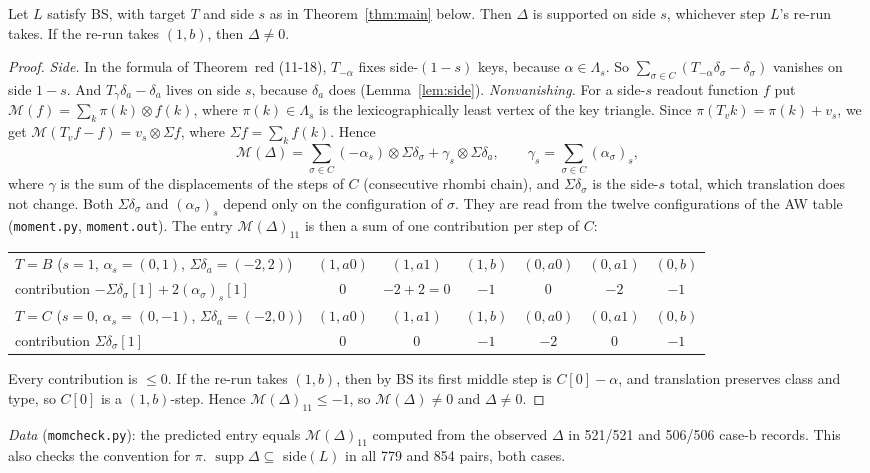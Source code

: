 \documentclass[11pt]{article}
\theoremstyle{definition}\newtheorem{definition}[theorem]{Definition}\newtheorem{remark}[theorem]{Remark}
\begin{document}
\begin{lemma}\label{lem:N}
Let $L$ satisfy BS, with target $T$ and side $s$ as in Theorem~\ref{thm:main} below. Then $\Delta$ is supported on side $s$, whichever step $L$'s re-run takes. If the re-run takes $(1,b)$, then $\Delta\ne0$.
\end{lemma}
\begin{proof}
\emph{Side.} In the formula of Theorem~red (11-18), $T_{-\alpha}$ fixes side-$(1-s)$ keys, because $\alpha\in\Lambda_s$. So $\sum_{\sigma\in C}(T_{-\alpha}\delta_\sigma-\delta_\sigma)$ vanishes on side $1-s$. And $T_\gamma\delta_a-\delta_a$ lives on side $s$, because $\delta_a$ does (Lemma~\ref{lem:side}).
\emph{Nonvanishing.} For a side-$s$ readout function $f$ put $\mathcal M(f)=\sum_k\pi(k)\otimes f(k)$, where $\pi(k)\in\Lambda_s$ is the lexicographically least vertex of the key triangle. Since $\pi(T_vk)=\pi(k)+v_s$, we get $\mathcal M(T_vf-f)=v_s\otimes\Sigma f$, where $\Sigma f=\sum_kf(k)$. Hence
\[\mathcal M(\Delta)=\sum_{\sigma\in C}(-\alpha_s)\otimes\Sigma\delta_\sigma+\gamma_s\otimes\Sigma\delta_a,\qquad\gamma_s=\sum_{\sigma\in C}(\alpha_\sigma)_s,\]
where $\gamma$ is the sum of the displacements of the steps of $C$ (consecutive rhombi chain), and $\Sigma\delta_\sigma$ is the side-$s$ total, which translation does not change. Both $\Sigma\delta_\sigma$ and $(\alpha_\sigma)_s$ depend only on the configuration of $\sigma$. They are read from the twelve configurations of the AW table (\texttt{moment.py}, \texttt{moment.out}). The entry $\mathcal M(\Delta)_{11}$ is then a sum of one contribution per step of $C$:
\begin{center}\small\begin{tabular}{lcccccc}\toprule
$T=B$ ($s=1$, $\alpha_s=(0,1)$, $\Sigma\delta_a=(-2,2)$) & $(1,a0)$ & $(1,a1)$ & $(1,b)$ & $(0,a0)$ & $(0,a1)$ & $(0,b)$\\
contribution $-\Sigma\delta_\sigma[1]+2(\alpha_\sigma)_s[1]$ & $0$ & $-2+2=0$ & $-1$ & $0$ & $-2$ & $-1$\\\midrule
$T=C$ ($s=0$, $\alpha_s=(0,-1)$, $\Sigma\delta_a=(-2,0)$) & $(1,a0)$ & $(1,a1)$ & $(1,b)$ & $(0,a0)$ & $(0,a1)$ & $(0,b)$\\
contribution $\Sigma\delta_\sigma[1]$ & $0$ & $0$ & $-1$ & $-2$ & $0$ & $-1$\\\bottomrule
\end{tabular}\end{center}
Every contribution is $\le0$. If the re-run takes $(1,b)$, then by BS its first middle step is $C[0]-\alpha$, and translation preserves class and type, so $C[0]$ is a $(1,b)$-step. Hence $\mathcal M(\Delta)_{11}\le-1$, so $\mathcal M(\Delta)\ne0$ and $\Delta\ne0$.
\end{proof}
\noindent\emph{Data} (\texttt{momcheck.py}): the predicted entry equals $\mathcal M(\Delta)_{11}$ computed from the observed $\Delta$ in 521/521 and 506/506 case-b records. This also checks the convention for $\pi$. $\operatorname{supp}\Delta\subseteq$ side$(L)$ in all 779 and 854 pairs, both cases.
\end{document}
